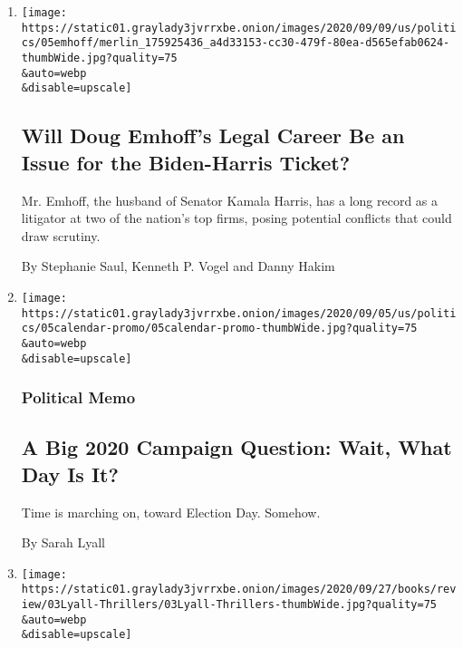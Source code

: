 \begin{enumerate}
\def\labelenumi{\arabic{enumi}.}
\item
  \href{/2020/09/08/us/politics/doug-emhoff-kamala-harris-law.html}{}

  \texttt{[image: https://static01.graylady3jvrrxbe.onion/images/2020/09/09/us/politics/05emhoff/merlin\_175925436\_a4d33153-cc30-479f-80ea-d565efab0624-thumbWide.jpg?quality=75\\\&auto=webp\\\&disable=upscale]}

  \hypertarget{will-doug-emhoffs-legal-career-be-an-issue-for-the-biden-harris-ticket}{%
  \subsection{Will Doug Emhoff's Legal Career Be an Issue for the
  Biden-Harris
  Ticket?}\label{will-doug-emhoffs-legal-career-be-an-issue-for-the-biden-harris-ticket}}

  Mr. Emhoff, the husband of Senator Kamala Harris, has a long record as
  a litigator at two of the nation's top firms, posing potential
  conflicts that could draw scrutiny.

  By Stephanie Saul, Kenneth P. Vogel and Danny Hakim
\item
  \href{/2020/09/05/us/politics/2020-election-calendar.html}{}

  \texttt{[image: https://static01.graylady3jvrrxbe.onion/images/2020/09/05/us/politics/05calendar-promo/05calendar-promo-thumbWide.jpg?quality=75\\\&auto=webp\\\&disable=upscale]}

  \hypertarget{political-memo}{%
  \subsubsection{Political Memo}\label{political-memo}}

  \hypertarget{a-big-2020-campaign-question-wait-what-day-is-it}{%
  \subsection{A Big 2020 Campaign Question: Wait, What Day Is
  It?}\label{a-big-2020-campaign-question-wait-what-day-is-it}}

  Time is marching on, toward Election Day. Somehow.

  By Sarah Lyall
\item
  \href{/2020/09/05/books/review/new-thrillers-eighth-detective-winter-counts.html}{}

  \texttt{[image: https://static01.graylady3jvrrxbe.onion/images/2020/09/27/books/review/03Lyall-Thrillers/03Lyall-Thrillers-thumbWide.jpg?quality=75\\\&auto=webp\\\&disable=upscale]}


\end{enumerate}

